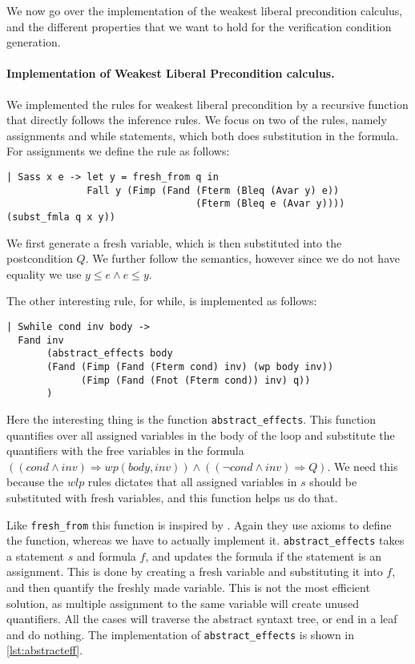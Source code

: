 We now go over the implementation of the weakest liberal precondition calculus, and the different properties that we want to hold for the verification condition generation.

\paragraph{Implementation of Weakest Liberal Precondition calculus.}
We implemented the rules for weakest liberal precondition by a recursive function that directly
follows the inference rules.
We focus on two of the rules, namely assignments and while statements, which both does substitution in the formula.
For assignments we define the rule as follows:

\begin{lstlisting}
| Sass x e -> let y = fresh_from q in
              Fall y (Fimp (Fand (Fterm (Bleq (Avar y) e))
                                 (Fterm (Bleq e (Avar y)))) (subst_fmla q x y))
\end{lstlisting}

We first generate a fresh variable, which is then substituted into the postcondition $Q$.
We further follow the semantics, however since we do not have equality we use $y \leq e \wedge e \leq y$.

The other interesting rule, for while, is implemented as follows:
\begin{lstlisting}
| Swhile cond inv body ->
  Fand inv
       (abstract_effects body
       (Fand (Fimp (Fand (Fterm cond) inv) (wp body inv))
             (Fimp (Fand (Fnot (Fterm cond)) inv) q))
       )
\end{lstlisting}

Here the interesting thing is the function \texttt{abstract\_effects}. This function quantifies over all assigned variables in the body of the loop and substitute the quantifiers with the free variables in the formula
$((cond \wedge inv) \Rightarrow wp(body,inv)) \wedge ((\neg cond \wedge inv) \Rightarrow Q)$.
We need this because the $wlp$ rules dictates that all assigned variables in $s$ should be
substituted with fresh variables, and this function helps us do that.


Like \texttt{fresh\_from} this function is inspired by \cite{wp-revisited}.
Again they use axioms to define the function, whereas we have to actually implement it.
\texttt{abstract\_effects} takes a statement $s$ and formula $f$, and updates the formula if the statement is an assignment.
This is done by creating a fresh variable and substituting it into $f$, and then quantify the freshly made variable.
This is not the most efficient solution, as multiple assignment to the same variable will create unused quantifiers.
All the cases will traverse the abstract syntaxt tree, or end in a leaf and do nothing.
The implementation of \texttt{abstract\_effects} is shown in \autoref{lst:abstracteff}.

